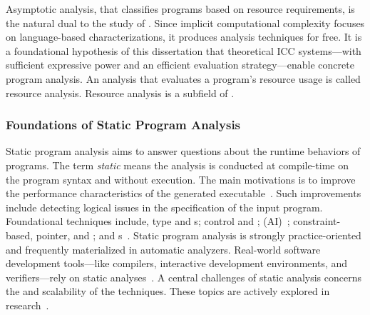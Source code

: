 Asymptotic analysis, that classifies programs based
on resource requirements, is the natural dual to the study of . Since implicit computational complexity focuses on language-based
characterizations, it produces analysis techniques for free. It is a
foundational hypothesis of this dissertation that theoretical ICC systems---with
sufficient expressive power and an efficient evaluation
strategy---enable concrete program analysis. An analysis that evaluates a
program's resource usage is called resource analysis. Resource
analysis is a subfield of .

\subsubsection{Foundations of Static Program Analysis}
\label{static-analysis-basics}

Static program analysis aims to answer questions about the runtime behaviors of
programs. The term \emph{static} means the analysis is conducted at compile-time
on the program syntax and without execution. The main motivations is to improve
the performance characteristics of the generated
executable~\cite{nielson2010,kennedy2001}. Such improvements include detecting
logical issues in the specification of the input program. Foundational
techniques include, \eg type and s;
control and ;  (AI)~\cite{cousot2021}; constraint-based, pointer, and ;
and s~\cite{nielson2010,moller2023}. Static program
analysis is strongly practice-oriented and frequently materialized in automatic
analyzers. Real-world software development tools---like compilers, interactive
development environments, and verifiers---rely on static
analyses~\cite{livshits2015}. A central challenges of static analysis concerns
the  and scalability of the techniques. These topics are actively
explored in research~\cite{schiebel2024,dudina2025,arzt2014}.

